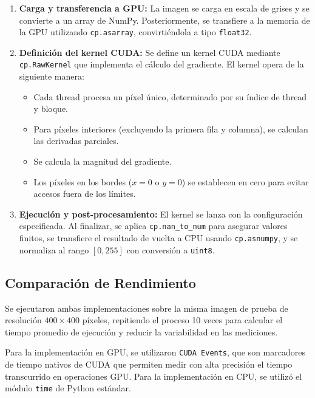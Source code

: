 \documentclass{pas}
\begin{document}
\begin{enumerate}
    \item \textbf{Carga y transferencia a GPU:} La imagen se carga en escala de grises y se convierte a un array de NumPy. Posteriormente, se transfiere a la memoria de la GPU utilizando \texttt{cp.asarray}, convirtiéndola a tipo \texttt{float32}.
    
    \item \textbf{Definición del kernel CUDA:} Se define un kernel CUDA mediante \texttt{cp.RawKernel} que implementa el cálculo del gradiente. El kernel opera de la siguiente manera:
    \begin{itemize}
        \item Cada thread procesa un píxel único, determinado por su índice de thread y bloque.
        \item Para píxeles interiores (excluyendo la primera fila y columna), se calculan las derivadas parciales.
        \item Se calcula la magnitud del gradiente.
        \item Los píxeles en los bordes ($x=0$ o $y=0$) se establecen en cero para evitar accesos fuera de los límites.
    \end{itemize}
    
    \item \textbf{Ejecución y post-procesamiento:} El kernel se lanza con la configuración especificada. Al finalizar, se aplica \texttt{cp.nan\_to\_num} para asegurar valores finitos, se transfiere el resultado de vuelta a CPU usando \texttt{cp.asnumpy}, y se normaliza al rango $[0, 255]$ con conversión a \texttt{uint8}.
\end{enumerate}


\subsection{Comparación de Rendimiento}

Se ejecutaron ambas implementaciones sobre la misma imagen de prueba de resolución $400 \times 400$ píxeles, repitiendo el proceso 10 veces para calcular el tiempo promedio de ejecución y reducir la variabilidad en las mediciones.

Para la implementación en GPU, se utilizaron \texttt{CUDA Events}, que son marcadores de tiempo nativos de CUDA que permiten medir con alta precisión el tiempo transcurrido en operaciones GPU. Para la implementación en CPU, se utilizó el módulo \texttt{time} de Python estándar.
\end{document}
